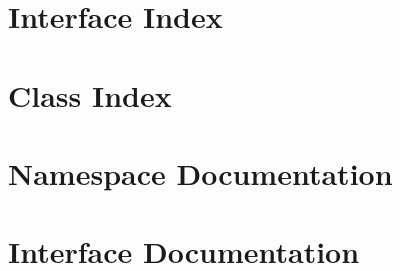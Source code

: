 \documentclass[twoside]{book}
\newcommand{\+}{\discretionary{\mbox{\scriptsize$\hookleftarrow$}}{}{}}
\begin{document}
\chapter{Interface Index}

\chapter{Class Index}

\chapter{Namespace Documentation}

\chapter{Interface Documentation}































\end{document}
